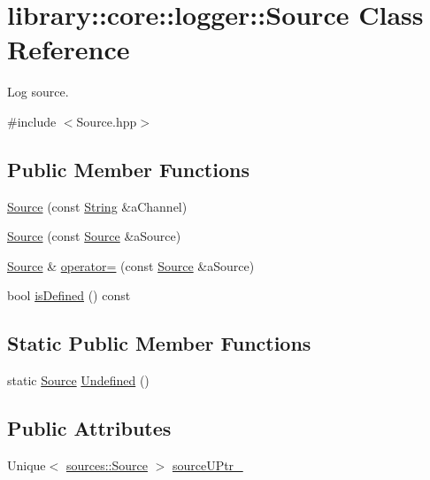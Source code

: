 \hypertarget{classlibrary_1_1core_1_1logger_1_1_source}{}\section{library\+:\+:core\+:\+:logger\+:\+:Source Class Reference}
\label{classlibrary_1_1core_1_1logger_1_1_source}


Log source.  




{\ttfamily \#include $<$Source.\+hpp$>$}

\subsection*{Public Member Functions}
\begin{DoxyCompactItemize}
\item 
\hyperlink{classlibrary_1_1core_1_1logger_1_1_source_a2e40fbdae5f8f4dd6a075992f11a939f}{Source} (const \hyperlink{classlibrary_1_1core_1_1types_1_1_string}{String} \&a\+Channel)
\item 
\hyperlink{classlibrary_1_1core_1_1logger_1_1_source_ae9d7e82827aa19efdd1c25d91911a9a6}{Source} (const \hyperlink{classlibrary_1_1core_1_1logger_1_1_source}{Source} \&a\+Source)
\item 
\hyperlink{classlibrary_1_1core_1_1logger_1_1_source}{Source} \& \hyperlink{classlibrary_1_1core_1_1logger_1_1_source_a844032b697c7727ea4e5519fb64fc955}{operator=} (const \hyperlink{classlibrary_1_1core_1_1logger_1_1_source}{Source} \&a\+Source)
\item 
bool \hyperlink{classlibrary_1_1core_1_1logger_1_1_source_ae6316fb0d4e45ea172bdb7004777e9b4}{is\+Defined} () const
\end{DoxyCompactItemize}
\subsection*{Static Public Member Functions}
\begin{DoxyCompactItemize}
\item 
static \hyperlink{classlibrary_1_1core_1_1logger_1_1_source}{Source} \hyperlink{classlibrary_1_1core_1_1logger_1_1_source_a098cba108fe47612f9ddbfb228a5ef8f}{Undefined} ()
\end{DoxyCompactItemize}
\subsection*{Public Attributes}
\begin{DoxyCompactItemize}
\item 
Unique$<$ \hyperlink{classlibrary_1_1core_1_1logger_1_1sources_1_1_source}{sources\+::\+Source} $>$ \hyperlink{classlibrary_1_1core_1_1logger_1_1_source_a9461165d5d581171a044200b58007a3a}{source\+U\+Ptr\+\_\+}
\end{DoxyCompactItemize}


